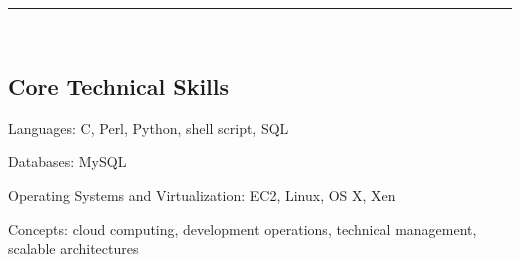 \documentclass[10pt,letterpaper]{article}
\newenvironment{indentsection}[1]%
{\begin{list}{}%
	{\setlength{\leftmargin}{#1}}%
	\item[]%
}
{\end{list}}
\begin{document}
\hrule\
\vspace{-0.4em}
\subsection*{Core Technical Skills}

\begin{indentsection}{\parindent}
	\begin{description*}
		\item[Languages:]
		C, Perl, Python, shell script, SQL
		\item[Databases:]
		MySQL
		\item[Operating Systems and Virtualization:]
		EC2, Linux, OS X, Xen
		\item[Concepts:]
		cloud computing, development operations, technical management, scalable architectures	
	\end{description*}
\end{indentsection}
\end{document}
